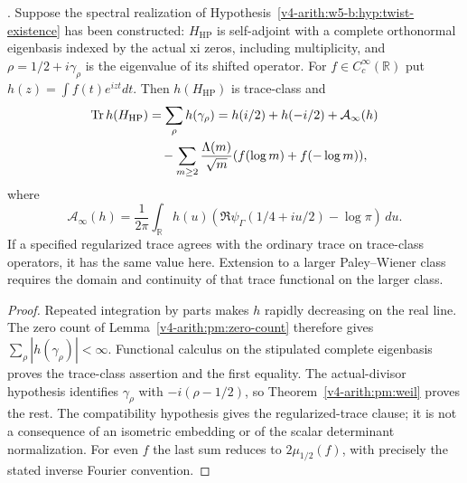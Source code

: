 \begin{proposition}
\label{v4-arith:w5-b:prop:weil-trace}
\ClaimStatusProvedHereConditional. Suppose the spectral realization
of Hypothesis~\ref{v4-arith:w5-b:hyp:twist-existence} has been
constructed: $H_{\mathrm{HP}}$ is self-adjoint with a complete
orthonormal eigenbasis indexed by the actual xi zeros, including
multiplicity, and $\rho=1/2+i\gamma_\rho$ is the eigenvalue of its
shifted operator. For $f\in C_c^\infty(\mathbb R)$ put
$h(z)=\int f(t)e^{izt}dt$. Then $h(H_{\mathrm{HP}})$ is trace-class
and
\begin{align}
\label{v4-arith:w5-b:eq:trace-identity}
 \operatorname{Tr}h(H_{\mathrm{HP}})
 &=\sum_\rho h(\gamma_\rho)
   =h(i/2)+h(-i/2)+\mathcal A_\infty(h)\notag\\
 &\quad-\sum_{m\geq2}\frac{\Lambda(m)}{\sqrt m}
                         (f(\log m)+f(-\log m)),
\end{align}
where
\[
 \mathcal A_\infty(h)=\frac1{2\pi}\int_{\mathbb R}
 h(u)(\Re\psi_\Gamma(1/4+iu/2)-\log\pi)\,du.
\]
If a specified regularized trace agrees with the ordinary trace
on trace-class operators, it has the same value here.
Extension to a larger Paley--Wiener class requires the domain and
continuity of that trace functional on the larger class.
\end{proposition}
\begin{proof}
Repeated integration by parts makes $h$ rapidly decreasing on the
real line. The zero count of Lemma~\ref{v4-arith:pm:zero-count}
therefore gives $\sum_\rho|h(\gamma_\rho)|<\infty$.
Functional calculus on the stipulated complete eigenbasis proves
the trace-class assertion and the first equality.
The actual-divisor hypothesis identifies $\gamma_\rho$ with
$-i(\rho-1/2)$, so Theorem~\ref{v4-arith:pm:weil} proves the rest.
The compatibility hypothesis gives the regularized-trace clause;
it is not a consequence of an isometric embedding or of the scalar
determinant normalization. For even $f$ the last sum reduces to
$2\mu_{1/2}(f)$, with precisely the stated inverse Fourier convention.
\end{proof}


